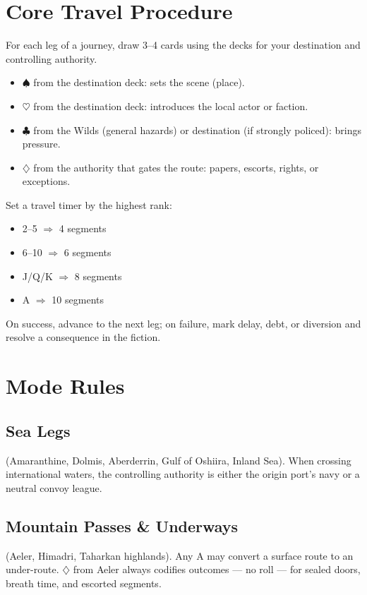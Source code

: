 \documentclass[11pt,letterpaper,twoside]{book}
\newcommand{\SuitSpade}{\ensuremath{\spadesuit}}
\newcommand{\SuitHeart}{\ensuremath{\heartsuit}}
\newcommand{\SuitClub}{\ensuremath{\clubsuit}}
\newcommand{\SuitDiamond}{\ensuremath{\diamondsuit}}
\begin{document}
\section{Core Travel Procedure}
For each leg of a journey, draw 3--4 cards using the decks for your destination and controlling authority.

\begin{itemize}
\item \SuitSpade{} from the destination deck: sets the scene (place).
\item \SuitHeart{} from the destination deck: introduces the local actor or faction.
\item \SuitClub{} from the Wilds (general hazards) or destination (if strongly policed): brings pressure.
\item \SuitDiamond{} from the authority that gates the route: papers, escorts, rights, or exceptions.
\end{itemize}

Set a travel timer by the highest rank:
\begin{itemize}
\item 2--5 $\Rightarrow$ 4 segments
\item 6--10 $\Rightarrow$ 6 segments
\item J/Q/K $\Rightarrow$ 8 segments
\item A $\Rightarrow$ 10 segments
\end{itemize}

On success, advance to the next leg; on failure, mark delay, debt, or diversion and resolve a consequence in the fiction.

\section{Mode Rules}

\subsection{Sea Legs}
(Amaranthine, Dolmis, Aberderrin, Gulf of Oshiira, Inland Sea). When crossing international waters, the controlling authority is either the origin port's navy or a neutral convoy league.

\subsection{Mountain Passes \& Underways}
(Aeler, Himadri, Taharkan highlands). Any A may convert a surface route to an under-route. \SuitDiamond{} from Aeler always codifies outcomes --- no roll --- for sealed doors, breath time, and escorted segments.
\end{document}
